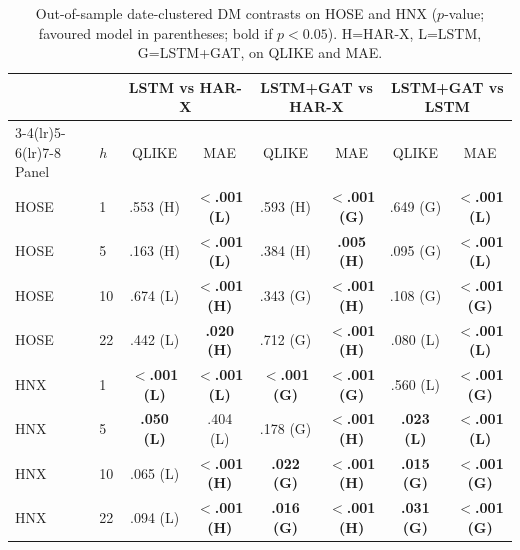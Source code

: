 \documentclass[runningheads]{llncs}
\begin{document}
\begin{table}[t]
\centering
\caption{Out-of-sample date-clustered DM contrasts on HOSE and HNX ($p$-value; favoured model in
parentheses; bold if $p<0.05$). H=HAR-X, L=LSTM, G=LSTM+GAT, on QLIKE and MAE.}
\label{tab:dmext}
\footnotesize
\setlength{\tabcolsep}{4pt}
\begin{tabular}{ll cc cc cc}
\toprule
& & \multicolumn{2}{c}{LSTM vs HAR-X} & \multicolumn{2}{c}{LSTM+GAT vs HAR-X} & \multicolumn{2}{c}{LSTM+GAT vs LSTM} \\
\cmidrule(lr){3-4}\cmidrule(lr){5-6}\cmidrule(lr){7-8}
Panel & $h$ & QLIKE & MAE & QLIKE & MAE & QLIKE & MAE \\
\midrule
HOSE & 1  & .553 (H) & \textbf{$<$.001 (L)} & .593 (H) & \textbf{$<$.001 (G)} & .649 (G) & \textbf{$<$.001 (L)} \\
HOSE & 5  & .163 (H) & \textbf{$<$.001 (L)} & .384 (H) & \textbf{.005 (H)} & .095 (G) & \textbf{$<$.001 (L)} \\
HOSE & 10 & .674 (L) & \textbf{$<$.001 (H)} & .343 (G) & \textbf{$<$.001 (H)} & .108 (G) & \textbf{$<$.001 (G)} \\
HOSE & 22 & .442 (L) & \textbf{.020 (H)} & .712 (G) & \textbf{$<$.001 (H)} & .080 (L) & \textbf{$<$.001 (L)} \\
\midrule
HNX & 1  & \textbf{$<$.001 (L)} & \textbf{$<$.001 (L)} & \textbf{$<$.001 (G)} & \textbf{$<$.001 (G)} & .560 (L) & \textbf{$<$.001 (G)} \\
HNX & 5  & \textbf{.050 (L)} & .404 (L) & .178 (G) & \textbf{$<$.001 (H)} & \textbf{.023 (L)} & \textbf{$<$.001 (L)} \\
HNX & 10 & .065 (L) & \textbf{$<$.001 (H)} & \textbf{.022 (G)} & \textbf{$<$.001 (H)} & \textbf{.015 (G)} & \textbf{$<$.001 (G)} \\
HNX & 22 & .094 (L) & \textbf{$<$.001 (H)} & \textbf{.016 (G)} & \textbf{$<$.001 (H)} & \textbf{.031 (G)} & \textbf{$<$.001 (G)} \\
\bottomrule
\end{tabular}
\end{table}
\end{document}
